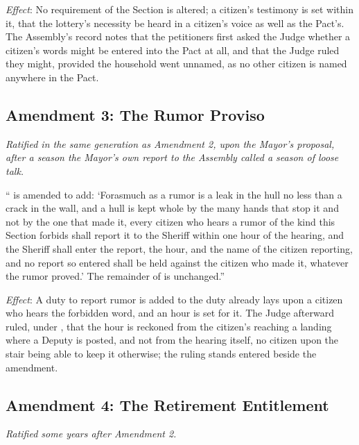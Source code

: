 \textit{Effect}: No requirement of the Section is altered; a citizen's testimony is set within it, that the lottery's necessity be heard in a citizen's voice as well as the Pact's. The Assembly's record notes that the petitioners first asked the Judge whether a citizen's words might be entered into the Pact at all, and that the Judge ruled they might, provided the household went unnamed, as no other citizen is named anywhere in the Pact.

\subsection*{Amendment 3: The Rumor Proviso}

\textit{Ratified in the same generation as Amendment 2, upon the Mayor's proposal, after a season the Mayor's own report to the Assembly called a season of loose talk.}

`` is amended to add: `Forasmuch as a rumor is a leak in the hull no less than a crack in the wall, and a hull is kept whole by the many hands that stop it and not by the one that made it, every citizen who hears a rumor of the kind this Section forbids shall report it to the Sheriff within one hour of the hearing, and the Sheriff shall enter the report, the hour, and the name of the citizen reporting, and no report so entered shall be held against the citizen who made it, whatever the rumor proved.' The remainder of  is unchanged.''

\textit{Effect}: A duty to report rumor is added to the duty  already lays upon a citizen who hears the forbidden word, and an hour is set for it. The Judge afterward ruled, under , that the hour is reckoned from the citizen's reaching a landing where a Deputy is posted, and not from the hearing itself, no citizen upon the stair being able to keep it otherwise; the ruling stands entered beside the amendment.

\subsection*{Amendment 4: The Retirement Entitlement}

\textit{Ratified some years after Amendment 2.}

